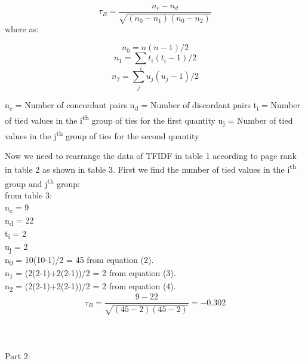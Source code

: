 \documentclass[a4paper,12pt]{article}
\begin{document}
\begin{equation}
\tau_B = \frac {n_c - n_d}{\sqrt{(n_0-n_1)(n_0-n_2)}}
\end{equation}
where as:
\begin{flushleft}

\begin{equation}
n_0 = n(n-1)/2
\end{equation}
\begin{equation}
n_1 = \sum_i t_i(t_i-1)/2
\end{equation}
\begin{equation}
n_2 = \sum_j u_j(u_j-1)/2
\end{equation}

n\textsubscript{c} = Number of concordant pairs
\linebreak
n\textsubscript{d} = Number of discordant pairs
\linebreak
t\textsubscript{i} = Number of tied values in the i\textsuperscript{th} group of ties for the first quantity
\linebreak
u\textsubscript{j} = Number of tied values in the j\textsuperscript{th} group of ties for the second quantity
\linebreak
\end{flushleft}
Now we need to rearrange the data of TFIDF in table 1 according to page rank in table 2 as shown in table 3. First we find the number of tied values in the i\textsuperscript{th} group and j\textsuperscript{th} group:\\
from table 3:\\
n\textsubscript{c} = 9\\
n\textsubscript{d} = 22\\
t\textsubscript{i} = 2\\
u\textsubscript{j} = 2\\
n\textsubscript{0} = 10(10-1)/2 = 45 from equation (2).\\
n\textsubscript{1} = (2(2-1)+2(2-1))/2 = 2 from equation (3).\\
n\textsubscript{2} = (2(2-1)+2(2-1))/2 = 2 from equation (4).\\

\begin{displaymath}
\tau_B = \frac {9 - 22}{\sqrt{(45-2)(45-2)}} = -0.302
\end{displaymath}
\\
\\
\\
Part 2:\\
\end{document}
